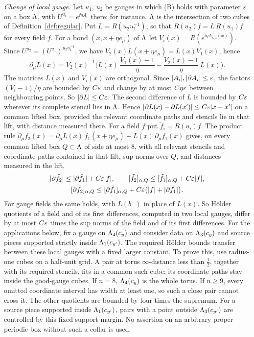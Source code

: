 \emph{Change of local gauge.} Let $u_1$, $u_2$ be gauges in which (B) holds with parameter $\varepsilon$ on a box $\Lambda$, with $U^{u_i}=e^{\ii\eta A_i}$ there; for instance, $\Lambda$ is the intersection of two cubes of Definition~\ref{def:regular}. Put $L=R(u_2u_1^{-1})$, so that $R(u_2)f=L\,R(u_1)f$ for every field $f$. For a bond $(x,x+\eta e_\mu)$ of $\Lambda$ let $V_i(x)=R(e^{\ii\eta A_{i,\mu}(x)})$. Since $U^{u_2}=(U^{u_1})^{u_2u_1^{-1}}$, we have $V_2(x)L(x+\eta e_\mu)=L(x)V_1(x)$, hence
\[
\partial_\mu L(x)=V_2(x)^{-1}\Big(L(x)\,\frac{V_1(x)-1}\eta-\frac{V_2(x)-1}\eta\,L(x)\Big).
\]
The matrices $L(x)$ and $V_i(x)$ are orthogonal. Since $|A_i|,|\partial A_i|\le\varepsilon$, the factors $(V_i-1)/\eta$ are bounded by $C\varepsilon$ and change by at most $C\eta\varepsilon$ between neighbouring points. So $|\partial L|\le C\varepsilon$. The second difference of $L$ is bounded by $C\varepsilon$ wherever its complete stencil lies in $\Lambda$. Hence $|\partial L(x)-\partial L(x')|\le C\varepsilon|x-x'|$ on a common lifted box, provided the relevant coordinate paths and stencils lie in that lift, with distance measured there. For a field $f$ put $\tilde f_i=R(u_i)f$. The product rule $\partial_\mu\tilde f_2(x)=\partial_\mu L(x)\,\tilde f_1(x+\eta e_\mu)+L(x)\,\partial_\mu\tilde f_1(x)$ gives, on every common lifted box $Q\subset\Lambda$ of side at most $8$, with all relevant stencils and coordinate paths contained in that lift, sup norms over $Q$, and distances measured in the lift,
\begin{gather*}
|\partial\tilde f_2|\le|\partial\tilde f_1|+C\eps|f|,\qquad\Hol{\tilde f_2}Q\le\Hol{\tilde f_1}Q+C\eps|f|,\\
\Hol{\partial\tilde f_2}Q\le\Hol{\partial\tilde f_1}Q+C\eps\big(|f|+|\partial\tilde f_1|\big).
\end{gather*}
For gauge fields the same holds, with $L(b_-)$ in place of $L(x)$. So H\"older quotients of a field and of its first differences, computed in two local gauges, differ by at most $C\varepsilon$ times the sup norms of the field and of its first differences. For the applications below, fix a gauge on $\Lambda_4(c_y)$ and consider data on $\Lambda_3(c_y)$ and source pieces supported strictly inside $\Lambda_1(c_{y'})$. The required H\"older bounds transfer between these local gauges with a fixed larger constant. To prove this, use radius-one cubes on a half-unit grid. A pair at torus $\infty$-distance less than $\frac12$, together with its required stencils, fits in a common such cube; its coordinate paths stay inside the good-gauge cubes. If $n=8$, $\Lambda_4(c_y)$ is the whole torus. If $n\ge9$, every omitted coordinate interval has width at least one, so such a close pair cannot cross it. The other quotients are bounded by four times the supremum. For a source piece supported inside $\Lambda_1(c_{y'})$, pairs with a point outside $\Lambda_3(c_{y'})$ are controlled by this fixed support margin. No assertion on an arbitrary proper periodic box without such a collar is used.

